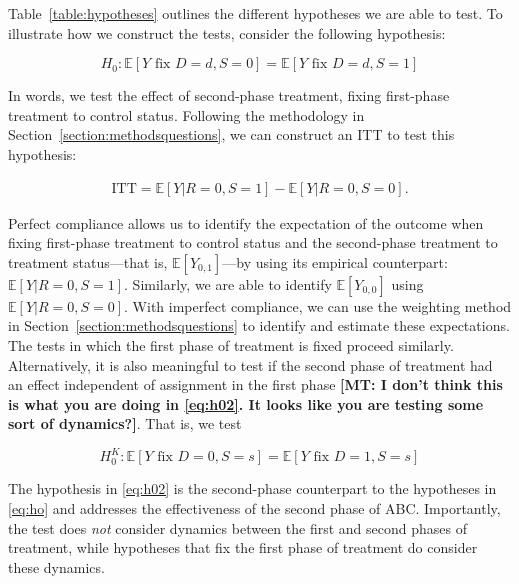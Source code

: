 \noindent Table~\ref{table:hypotheses} outlines the different hypotheses we are able to test. To illustrate how we construct the tests, consider the following hypothesis: 

\begin{equation}
H_{0}: \mathbb{E} \left[ Y \text{ fix } D = d, S = 0 \right]  = \mathbb{E} \left[ Y \text{ fix } D = d, S = 1 \right]  \label{eq:h0fixfirst}
\end{equation}

\noindent In words, we test the effect of second-phase treatment, fixing first-phase treatment to control status. Following the methodology in Section~\ref{section:methodsquestions}, we can construct an ITT to test this hypothesis: 

\begin{eqnarray}
\text{ITT} = \mathbb{E} \left[ Y | R = 0, S = 1 \right] - \mathbb{E} \left[ Y | R = 0, S = 0 \right]. 
\end{eqnarray}

\noindent Perfect compliance allows us to identify the expectation of the outcome when fixing first-phase treatment to control status and the second-phase treatment to treatment status---that is, $\mathbb{E} \left[ Y_{0,1} \right]$---by using its empirical counterpart: $\mathbb{E} \left[ Y | R = 0, S = 1 \right]$. Similarly, we are able to identify $\mathbb{E} \left[ Y_{0,0} \right]$ using $\mathbb{E} \left[ Y | R = 0, S = 0 \right]$. With imperfect compliance, we can use the weighting method in Section~\ref{section:methodsquestions} to identify and estimate these expectations. The tests in which the first phase of treatment is fixed proceed similarly.\\

\noindent Alternatively, it is also meaningful to test if the second phase of treatment had an effect independent of assignment in the first phase \textbf{[MT: I don't think this is what you are doing in \eqref{eq:h02}. It looks like you are testing some sort of dynamics?]}. That is, we test

\begin{equation}
H_{0}^K: \mathbb{E} \left[ Y \text{ fix } D = 0, S = s \right] = \mathbb{E} \left[ Y \text{ fix } D = 1, S = s \right] \label{eq:h02}
\end{equation}

\noindent The hypothesis in \eqref{eq:h02} is the second-phase counterpart to the hypotheses in \eqref{eq:ho} and addresses the effectiveness of the second phase of ABC. Importantly, the test does \emph{not} consider dynamics between the first and second phases of treatment, while hypotheses that fix the first phase of treatment do consider these dynamics.\\

